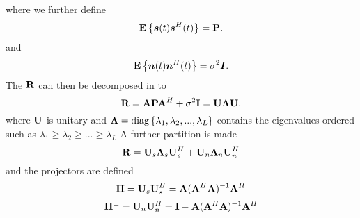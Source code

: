where we further define 
\begin{equation}
\mathbf{E}\left\{\bm{s}(t)\bm{s}^H(t)\right\} = \mathbf{P}\\.
\end{equation}
and
\begin{equation}
\mathbf{E}\left\{\bm{n}(t)\bm{n}^H(t)\right\} = \sigma ^2 \bm{I}\\.
\end{equation}
The $\mathbf{R}$ can then be decomposed in to
\begin{equation}
\mathbf{R} = \mathbf{A}\mathbf{P}\mathbf{A}^H+\sigma^2\mathbf{I} = \mathbf{U}\mathbf{\Lambda}\mathbf{U}\\.
\end{equation}
where $\mathbf{U}$ is unitary and $\mathbf{\Lambda} = \operatorname{diag}\left\{\lambda_1,\lambda_2,...,\lambda_L\right\}$ contains the eigenvalues ordered such as $\lambda_1 \geq \lambda_2 \geq ... \geq \lambda_L$
A further partition is made
\begin{equation}
	\mathbf{R}  = \mathbf{U}_s\mathbf{\Lambda}_s\mathbf{U}_s^H + \mathbf{U}_n\mathbf{\Lambda}_n\mathbf{U}_n^H
\end{equation}
and the projectors are defined
\begin{equation}
\mathbf{\Pi} =  \mathbf{U}_s\mathbf{U}_s^H = \mathbf{A}(\mathbf{A}^H\mathbf{A})^{-1}\mathbf{A}^H
\end{equation}
\begin{equation}
\mathbf{\Pi}^\bot =  \mathbf{U}_n\mathbf{U}_n^H = \mathbf{I}- \mathbf{A}(\mathbf{A}^H\mathbf{A})^{-1}\mathbf{A}^H
\end{equation}